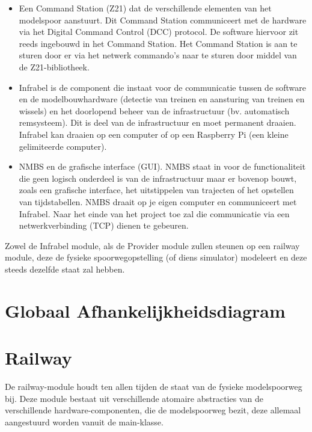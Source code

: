 \documentclass[a4paper, 11pt]{article}
\newcommand{\<}{\scriptsize\textless\normalsize}
\renewcommand{\>}{\scriptsize\textgreater\normalsize}
\begin{document}
\begin{itemize}
	\item Een Command Station (Z21) dat de verschillende elementen van het modelspoor aanstuurt. Dit Command Station communiceert met de hardware via het Digital Command Control (DCC) protocol. De software hiervoor zit reeds ingebouwd in het Command Station. Het Command Station is aan te sturen door er via het netwerk commando’s naar te sturen door middel van de Z21-bibliotheek.
	\item Infrabel is de component die instaat voor de communicatie tussen de software en de
	modelbouwhardware (detectie van treinen en aansturing van treinen en wissels) en het
	doorlopend beheer van de infrastructuur (bv. automatisch remsysteem). Dit is deel van de infrastructuur en moet permanent draaien. Infrabel kan draaien op een computer of op een Raspberry Pi (een kleine gelimiteerde computer).
	\item NMBS en de grafische interface (GUI). NMBS staat in voor de functionaliteit die geen
	logisch onderdeel is van de infrastructuur maar er bovenop bouwt, zoals een grafische
	interface, het uitstippelen van trajecten of het opstellen van tijdstabellen. NMBS draait
	op je eigen computer en communiceert met Infrabel. Naar het einde van het project toe
	zal die communicatie via een netwerkverbinding (TCP) dienen te gebeuren.
\end{itemize}
Zowel de Infrabel module, als de Provider module zullen steunen op een railway module, deze de fysieke spoorwegopstelling (of diens simulator) modeleert en deze steeds dezelfde staat zal hebben.

\newpage

\section{Globaal Afhankelijkheidsdiagram} %
\begin{center}
\end{center}

\newpage

\section{Railway} %
De railway-module houdt ten allen tijden de staat van de fysieke modelspoorweg bij. Deze module bestaat uit verschillende atomaire abstracties van de verschillende hardware-componenten, die de modelspoorweg bezit, deze allemaal aangestuurd worden vanuit de main-klasse.
\end{document}
